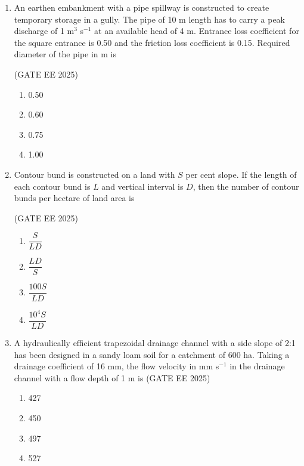\documentclass[journal,12pt,onecolumn]{IEEEtran}
\theoremstyle{remark}
\begin{document}
\begin{enumerate}
\item An earthen embankment with a pipe spillway is constructed to create temporary storage in a gully. The pipe of 10 m length has to carry a peak discharge of 1 m$^{3}$ s$^{-1}$ at an available head of 4 m. Entrance loss coefficient for the square entrance is 0.50 and the friction loss coefficient is 0.15. Required diameter of the pipe in m is

\hfill(GATE EE 2025)

\begin{multicols}{4}
\begin{enumerate}
\item 0.50
\item 0.60
\item 0.75
\item 1.00
\end{enumerate}
\end{multicols}

\item Contour bund is constructed on a land with $S$ per cent slope. If the length of each contour bund is $L$ and vertical interval is $D$, then the number of contour bunds per hectare of land area is

\hfill(GATE EE 2025)

\begin{multicols}{4}
\begin{enumerate}
\item $\dfrac{S}{LD}$
\item $\dfrac{LD}{S}$
\item $\dfrac{100S}{LD}$
\item $\dfrac{10^4 S}{LD}$
\end{enumerate}
\end{multicols}

\item A hydraulically efficient trapezoidal drainage channel with a side slope of 2:1 has been designed in a sandy loam soil for a catchment of 600 ha. Taking a drainage coefficient of 16 mm, the flow velocity in mm s$^{-1}$ in the drainage channel with a flow depth of 1 m is
\hfill(GATE EE 2025)
\begin{multicols}{4}
\begin{enumerate}
\item 427
\item 450
\item 497
\item 527
\end{enumerate}
\end{multicols}


\end{enumerate}
\end{document}
